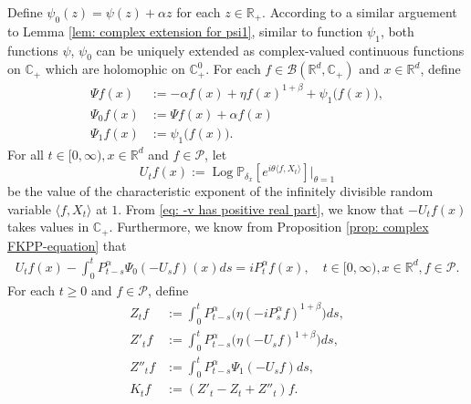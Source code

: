 \documentclass[12pt,a4paper]{amsart}
\theoremstyle{plain}
\theoremstyle{definition}
\numberwithin{equation}{section}
\begin{document}
    Define $\psi_0(z)=\psi(z)+\alpha z$ for each $z\in \mathbb{R}_+$. 
    According to a similar arguement to Lemma \ref{lem: complex extension for psi1}, similar to function $\psi_1$, both functions $\psi$, $\psi_0$ can be uniquely extended as complex-valued continuous functions on $\mathbb C_+$ which are holomophic on $\mathbb C^0_+$.
    For each $f\in \mathcal B(\mathbb R^d, \mathbb C_+)$ and $x\in \mathbb R^d$, define 
\begin{equation}\begin{split}
    \Psi f (x) &:= -\alpha f(x) + \eta f(x)^{1+\beta} + \psi_1\big(f(x)\big),
    \\\Psi_0 f(x) &:= \Psi f(x) + \alpha f(x)
    \\ \Psi_1 f(x) &:= \psi_1 \big(f(x)\big).
\end{split}\end{equation}
    For all $t\in [0,\infty), x\in \mathbb R^d $ and $f \in \mathcal{P}$, let \[U_tf(x) := \operatorname{Log} \mathbb P_{\delta_x}[e^{i\theta \langle f, X_t\rangle}]|_{\theta = 1}\] be the value of the characteristic exponent of the infinitely divisible random variable $\langle f, X_t\rangle$ at $1$.
    From \eqref{eq: -v has positive real part}, we know that $-U_tf(x)$ takes values in $\mathbb C_+$. Furthermore, we know from Proposition \ref{prop: complex FKPP-equation} that
\begin{equation}\begin{split}
\label{eq:chareq2}
    U_tf(x)-\int_0^t P^\alpha_{t-s} \Psi_0(-U_sf)(x)ds
    =i P^{\alpha}_t f(x),
    \quad t\in [0,\infty), x\in \mathbb{R}^d, f\in \mathcal P.
\end{split}\end{equation}
    For each $t\geq 0$ and $f\in \mathcal P$, define
\begin{equation}\begin{split}
\label{eq: def of Zf}
    Z_t f
    &:= \int_0^t P^\alpha_{t-s}\big( \eta (-i P^\alpha_sf)^{1+\beta}\big)ds,
    \\ Z'_t f
    &:= \int_0^t P^\alpha_{t-s}\big( \eta (-U_s f)^{1+\beta}\big)ds,
    \\ Z''_t f
    &:= \int_0^t P^\alpha_{t-s}\Psi_1(-U_s f)ds,
    \\ K_t f
    &:= (Z'_t - Z_t+ Z''_t)f.
\end{split}\end{equation}
\end{document}
